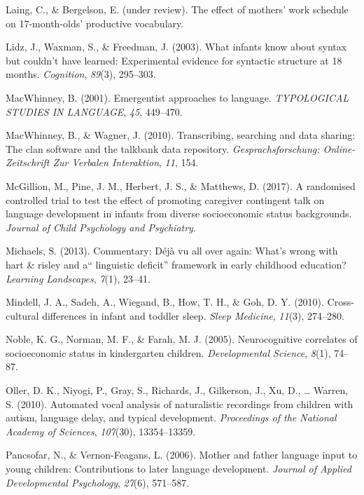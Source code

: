\documentclass[man]{apa6}
\theoremstyle{definition}
\theoremstyle{definition}
\theoremstyle{definition}
\theoremstyle{remark}
\begin{document}
\hypertarget{ref-Laing_Bergelson_17}{}
Laing, C., \& Bergelson, E. (under review). The effect of mothers' work
schedule on 17-month-olds' productive vocabulary.

\hypertarget{ref-lidz2003infants}{}
Lidz, J., Waxman, S., \& Freedman, J. (2003). What infants know about
syntax but couldn't have learned: Experimental evidence for syntactic
structure at 18 months. \emph{Cognition}, \emph{89}(3), 295--303.

\hypertarget{ref-macwhinney2001emergentist}{}
MacWhinney, B. (2001). Emergentist approaches to language.
\emph{TYPOLOGICAL STUDIES IN LANGUAGE}, \emph{45}, 449--470.

\hypertarget{ref-macwhinney2010transcribing}{}
MacWhinney, B., \& Wagner, J. (2010). Transcribing, searching and data
sharing: The clan software and the talkbank data repository.
\emph{Gesprachsforschung: Online-Zeitschrift Zur Verbalen Interaktion},
\emph{11}, 154.

\hypertarget{ref-mcgillion2017randomised}{}
McGillion, M., Pine, J. M., Herbert, J. S., \& Matthews, D. (2017). A
randomised controlled trial to test the effect of promoting caregiver
contingent talk on language development in infants from diverse
socioeconomic status backgrounds. \emph{Journal of Child Psychology and
Psychiatry}.

\hypertarget{ref-michaels2013commentary}{}
Michaels, S. (2013). Commentary: Déjà vu all over again: What's wrong
with hart \& risley and a`` linguistic deficit'' framework in early
childhood education? \emph{Learning Landscapes}, \emph{7}(1), 23--41.

\hypertarget{ref-mindell2010cross}{}
Mindell, J. A., Sadeh, A., Wiegand, B., How, T. H., \& Goh, D. Y.
(2010). Cross-cultural differences in infant and toddler sleep.
\emph{Sleep Medicine}, \emph{11}(3), 274--280.

\hypertarget{ref-noble2005neurocognitive}{}
Noble, K. G., Norman, M. F., \& Farah, M. J. (2005). Neurocognitive
correlates of socioeconomic status in kindergarten children.
\emph{Developmental Science}, \emph{8}(1), 74--87.

\hypertarget{ref-oller2010automated}{}
Oller, D. K., Niyogi, P., Gray, S., Richards, J., Gilkerson, J., Xu, D.,
\ldots{} Warren, S. (2010). Automated vocal analysis of naturalistic
recordings from children with autism, language delay, and typical
development. \emph{Proceedings of the National Academy of Sciences},
\emph{107}(30), 13354--13359.

\hypertarget{ref-pancsofar2006mother}{}
Pancsofar, N., \& Vernon-Feagans, L. (2006). Mother and father language
input to young children: Contributions to later language development.
\emph{Journal of Applied Developmental Psychology}, \emph{27}(6),
571--587.
\end{document}
